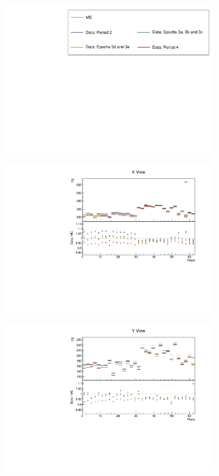 \documentclass[12pt,a4paper]{article}
\begin{document}
\begin{figure}[h!]
  \begin{subfigure}{\textwidth}
  \centering
    \includegraphics[height=0.2\linewidth]{essentialsec_tb/legend.pdf}
  \end{subfigure}
  \vspace*{2mm}

  \begin{subfigure}{0.5\textwidth}
    \includegraphics[width=\linewidth]{essentialsec_tb/pe_plane_x.pdf}
  \end{subfigure}
  \begin{subfigure}{0.5\textwidth}
    \includegraphics[width=\linewidth]{essentialsec_tb/pe_plane_y.pdf}

\end{subfigure}
\end{figure}
\end{document}
